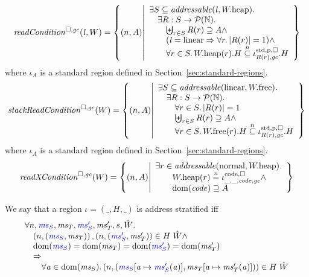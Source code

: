 \documentclass[a4paper]{article}
\begin{document}
\[
  \readCond{\lin,W} = \left\{ \npair{A} \middle| 
    \begin{array}{l}
      \exists S \subseteq \addressable{\lin, \pwheap} \ldotp \\
      \quad \exists R : S \fun \powerset{\nats} \ldotp\\
      \qquad \biguplus_{r\in S} R(r) \supseteq A \wedge\\
      \qquad (\lin = \linear \Rightarrow \forall r\ldotp |R(r)|  = 1) \wedge\\
      \qquad \forall r \in S \ldotp \pwheap(r).H \nsubeq \stdreg{R(r),\gc}{\pur}.H
    \end{array}
  \right\}
\]
where $\iota_A$ is a standard region defined in Section~\ref{sec:standard-regions}.
\[
  \stackReadCond{W} = \left\{ \npair{A} \middle| 
    \begin{array}{l}
      \exists S \subseteq \addressable{\linear, \pwfree} \ldotp \\
      \quad \exists R : S \fun \powerset{\nats} \ldotp\\
      \qquad \forall r \in S \ldotp |R(r)| = 1\\
      \qquad \biguplus_{r\in S} R(r) \supseteq A \wedge \\
      \qquad \forall r \in S \ldotp \pwfree(r).H \nsubeq \stdreg{R(r),\gc}{\pur}.H
    \end{array}
  \right\}
\]
where $\iota_A$ is a standard region defined in Section~\ref{sec:standard-regions}.
\[
  \xReadCond{W} = \left\{ \npair{A} \middle| 
    \begin{array}{l}
      \exists r \in \addressable{\normal, \pwheap} \ldotp \\
      \qquad \pwheap(r) \nequal \codereg{\_,\_,\code,\gc}\wedge\\
      \qquad \dom(\code) \supseteq A 
    \end{array}
  \right\}
\]

\begin{definition}
  \label{def:address-stratified}
  We say that a region $\iota = (\_,H,\_)$ is address stratified iff
  \[
    \begin{array}{l}
      \forall n, \src{\ms_S},\ms_T,\src{\ms_S'},\ms_T',s,\hat{W}\ldotp \\
      \quad \npair{\stpair{\ms}{\ms}}, \npair{\stpair[.]{\ms_S'}{\ms_T'}} \in H \; \hat{W} \wedge \\
      \quad \dom(\src{\ms_S}) = \dom(\ms_T) = \dom(\src{\ms_S'}) = \dom(\ms_T') \\
      \quad \Rightarrow \\
      \qquad \forall \aaddr \in \dom(\ms_S) \ldotp \npair{(\src{\ms_S}\update{\aaddr}{\src{\ms_S'}(\aaddr)},\ms_T\update{\aaddr}{\ms_T'(\aaddr)})} \in H \; \hat{W}
    \end{array}
  \]
\end{definition}
\end{document}
